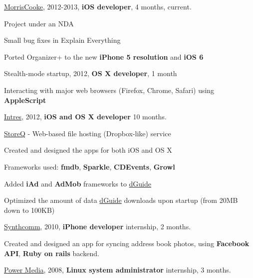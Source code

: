 \documentclass[letterpaper]{article}
\renewenvironment{itemize}{
  \begin{list}{}{
    \setlength{\leftmargin}{1.5em}
  }
}{
  \end{list}
}
\begin{document}
\begin{itemize}
    \item \href{http://www.morriscooke.com}{MorrisCooke}, 2012-2013, {\bf iOS developer}, 4 months, current.
		\begin{itemize}
            \item Project under an NDA
            \item Small bug fixes in Explain Everything
            \item Ported Organizer+ to the new {\bf iPhone 5 resolution} and {\bf iOS 6}
		\end{itemize}

	\item Stealth-mode startup, 2012, {\bf OS X developer}, 1 month
		\begin{itemize}
			\item Interacting with major web browsers (Firefox, Chrome, Safari) using {\bf AppleScript}
		\end{itemize}

    \item \href{http://intres.com.pl}{Intres}, 2012, {\bf iOS and OS X developer} 10 months.
		\begin{itemize}

            \item \href{http://storeq.com}{StoreQ} - Web-based file hosting (Dropbox-like) service
                \begin{itemize}
                    \item Created and designed the apps for both iOS and OS X
                    \item Frameworks used: {\bf fmdb}, {\bf Sparkle}, {\bf CDEvents}, {\bf Growl}
                \end{itemize}

            \item Added {\bf iAd} and {\bf AdMob} frameworks to \href{http://dguide.pl}{dGuide}

            \item Optimized the amount of data \href{http://dguide.pl}{dGuide} downloads upon startup (from 20MB down to 100KB)\\

        \end{itemize}

    \item \href{http://www.linkedin.com/company/synthcomm-sp.-z-o.o.}{Synthcomm}, 2010, {\bf iPhone developer} internship, 2 months.
		\begin{itemize}

			\item Created and designed an app for syncing address book photos,
                using {\bf Facebook API}, {\bf Ruby on rails} backend.

		\end{itemize}

    \item \href{http://power.com.pl}{Power Media}, 2008, {\bf Linux system administrator} internship, 3 months.
\end{itemize}
\end{document}
